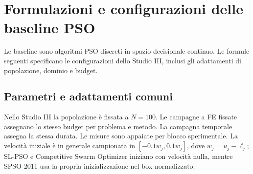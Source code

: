 \section{Formulazioni e configurazioni delle baseline PSO}
\label{app:baselines}

Le baseline sono algoritmi PSO discreti in spazio decisionale continuo. Le formule seguenti specificano le configurazioni dello Studio III, inclusi gli adattamenti di popolazione, dominio e budget.

\subsection{Parametri e adattamenti comuni}

Nello Studio III la popolazione è fissata a $N=100$. Le campagne a FE fissate assegnano lo stesso budget per problema e metodo. La campagna temporale assegna la stessa durata. Le misure sono appaiate per blocco sperimentale. La velocità iniziale è in generale campionata in $[-0.1w_j,0.1w_j]$, dove $w_j=u_j-\ell_j$; SL-PSO e Competitive Swarm Optimizer iniziano con velocità nulla, mentre SPSO-2011 usa la propria inizializzazione nel box normalizzato.

